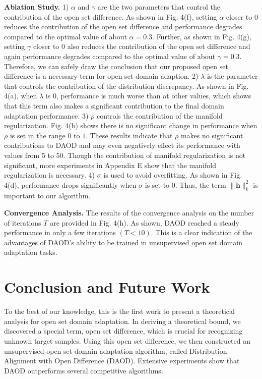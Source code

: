 \documentclass[journal]{IEEEtran}
\begin{document}
{\textbf{Ablation Study.} } 
1) $\alpha$ and $\gamma$ are the two parameters that control the contribution of the open set difference. As shown in Fig. 4(f), setting $\alpha$ closer to $0$ reduces the contribution of the open set difference and performance degrades compared to the optimal value of about $\alpha = 0.3$. Further, as shown in Fig. 4(g), setting $\gamma$ closer to $0$ also reduces the contribution of the open set difference and again performance degrades compared to the optimal value of about $\gamma=0.3$. Therefore, we can safely draw the conclusion that our proposed open set difference is a necessary term for open set domain adaption. 2) $\lambda$ is the parameter that controls the contribution of the distribution discrepancy. As shown in Fig. 4(a), when $\lambda$ is $0$, performance is much worse than at other values, which shows that this term also makes a significant contribution to the final domain adaptation performance. 3) {$\rho$ controls the contribution of the manifold regularization. Fig. 4(b) shows there is no significant change in performance when $\rho$ is set in the range $0$ to $1$. These results indicate that $\rho$ makes no significant  contributions to DAOD and may even negatively effect its performance with values from $5$ to $50$. { Though the contribution of  manifold regularization is not significant,  more experiments in Appendix E show that the manifold regularization is necessary}}. 4) $\sigma$ is used to avoid overfitting. As shown in Fig. 4(d), performance drops significantly when $\sigma$ is set to 0. Thus, the term $\|{\bm h}\|_k^2$ is important to our algorithm.


\textbf{Convergence Analysis.}  The results of the convergence analysis on the number of iterations $T$ are provided in Fig. 4(h). As shown, DAOD reached a steady performance in only a few iterations $(T < 10)$. This is a clear indication of the advantages of DAOD's ability to be trained in unsupervised open set domain adaptation tasks. 




















\section{Conclusion and Future Work }
To the best of our knowledge, this is the first work to present a theoretical analysis for open set domain adaptation. In deriving a theoretical bound, we discovered a special term, open set difference, which is crucial for recognizing unknown target samples. Using this open set difference, we then constructed an unsupervised open set domain adaptation algorithm, called Distribution Alignment with Open Difference (DAOD). Extensive experiments show that DAOD outperforms several competitive algorithms.
\end{document}
